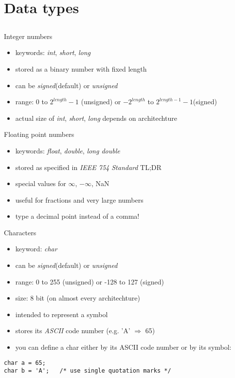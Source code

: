 \section{Data types}
\subsection{}
\begin{frame}{Integer numbers}
	\begin{itemize}
		\item keywords: \textit{int}, \textit{short}, \textit{long}
		\item stored as a binary number with fixed length
		\item can be \textit{signed}(default) or \textit{unsigned} 
		\item range: 0 to $2^{length}-1$ (unsigned) or $-2^{length}$ to $2^{length-1}-1$(signed)
		\item actual size of \textit{int}, \textit{short}, \textit{long} depends on architechture
	\end{itemize}
\end{frame}
\begin{frame}{Floating point numbers}
	\begin{itemize}
		\item keywords: \textit{float}, \textit{double}, \textit{long double}
		\item stored as specified in \textit{IEEE 754 Standard} TL;DR
		\item special values for $\infty$, $-\infty$, NaN
		\item useful for fractions and very large numbers
		\item type a decimal point instead of a comma!
	\end{itemize}
\end{frame}
\begin{frame}[fragile]{Characters}
	\begin{itemize}
		\item keyword: \textit{char}
		\item can be \textit{signed}(default) or \textit{unsigned}
		\item range: 0 to 255 (unsigned) or -128 to 127 (signed)	
		\item size: 8 bit (on almost every architechture)
		\item intended to represent a symbol
		\item stores its \textit{ASCII} code number (e.g. 'A' $\Rightarrow$ 65)
		\item you can define a char either by its ASCII code number or by its symbol:
	\end{itemize}
	\begin{lstlisting}[numbers=none]
char a = 65;
char b = 'A';	/* use single quotation marks */
\end{lstlisting}
\end{frame}
